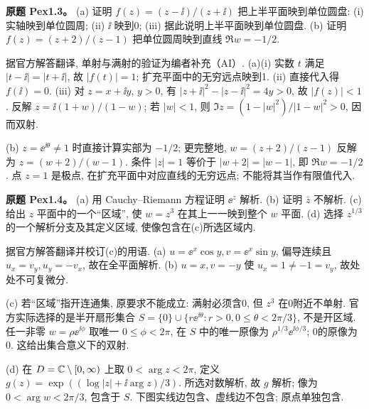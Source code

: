 \begin{exercise}\label{ass:pex1-3}
\textbf{原题 Pex1.3。} (a) 证明 $f(z)=(z-\ii)/(z+\ii)$ 把上半平面映到单位圆盘: (i) 实轴映到单位圆周; (ii) $\ii$ 映到0; (iii) 据此说明上半平面映到单位圆盘. (b) 证明 $f(z)=(z+2)/(z-1)$ 把单位圆周映到直线 $\Re w=-1/2$.
\end{exercise}
\begin{solution}
据官方解答翻译, 单射与满射的验证为编者补充（AI）. (a)(i) 实数 $t$ 满足 $|t-\ii|=|t+\ii|$, 故 $|f(t)|=1$; 扩充平面中的无穷远点映到1. (ii) 直接代入得 $f(\ii)=0$. (iii) 对 $z=x+\ii y$, $y>0$, 有 $|z+\ii|^2-|z-\ii|^2=4y>0$, 故 $|f(z)|<1$. 反解 $z=\ii(1+w)/(1-w)$; 若 $|w|<1$, 则 $\Im z=(1-|w|^2)/|1-w|^2>0$, 因而双射.

(b) $z=\ee^{\ii\theta}\ne1$ 时直接计算实部为 $-1/2$; 更完整地, $w=(z+2)/(z-1)$ 反解为 $z=(w+2)/(w-1)$. 条件 $|z|=1$ 等价于 $|w+2|=|w-1|$, 即 $\Re w=-1/2$. 点 $z=1$ 是极点, 在扩充平面中对应直线的无穷远点; 不能将其当作有限值代入.
\end{solution}
\begin{exercise}\label{ass:pex1-4}
\textbf{原题 Pex1.4。} (a) 用 Cauchy--Riemann 方程证明 $\ee^z$ 解析. (b) 证明 $\bar z$ 不解析. (c) 给出 $z$ 平面中的一个“区域”, 使 $w=z^3$ 在其上一一映到整个 $w$ 平面. (d) 选择 $z^{1/3}$ 的一个解析分支及其定义区域, 使像包含在(c)所选区域内.
\end{exercise}
\begin{solution}
据官方解答翻译并校订(c)的用语. (a) $u=\ee^x\cos y,v=\ee^x\sin y$, 偏导连续且 $u_x=v_y, u_y=-v_x$, 故在全平面解析. (b) $u=x,v=-y$ 使 $u_x=1\ne-1=v_y$, 故处处不可复微分.

(c) 若“区域”指开连通集, 原要求不能成立: 满射必须含0, 但 $z^3$ 在0附近不单射. 官方实际选择的是半开扇形集合 $S=\{0\}\cup\{r\ee^{\ii\theta}:r>0,0\le\theta<2\pi/3\}$, 不是开区域. 任一非零 $w=\rho\ee^{\ii\phi}$ 取唯一 $0\le\phi<2\pi$, 在 $S$ 中的唯一原像为 $\rho^{1/3}\ee^{\ii\phi/3}$; 0的原像为0. 这给出集合意义下的双射.

(d) 在 $D=\mathbb C\setminus[0,\infty)$ 上取 $0<\arg z<2\pi$, 定义 $g(z)=\exp((\log|z|+\ii\arg z)/3)$. 所选对数解析, 故 $g$ 解析; 像为 $0<\arg w<2\pi/3$, 包含于 $S$. 下图实线边包含、虚线边不包含; 原点单独包含.
\begin{center}\end{center}
\end{solution}

